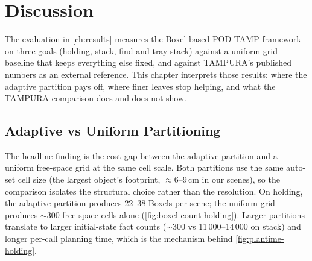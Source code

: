 
\chapter{Discussion}
\label{ch:discussion}

The evaluation in \cref{ch:results} measures the Boxel-based POD-TAMP
framework on three goals (holding, stack, find-and-tray-stack) against a
uniform-grid baseline that keeps everything else fixed, and against
TAMPURA's published numbers as an external reference. This chapter
interprets those results: where the adaptive partition pays off, where
finer leaves stop helping, and what the TAMPURA comparison does and does
not show.

\section{Adaptive vs Uniform Partitioning}
\label{sec:disc-semantic-vs-uniform}

The headline finding is the cost gap between the adaptive partition and a
uniform free-space grid at the same cell scale. Both partitions use the
same auto-set cell size (the largest object's footprint, $\approx$6--9\,cm
in our scenes), so the comparison isolates the structural choice rather
than the resolution. On holding, the adaptive partition produces 22--38
Boxels per scene; the uniform grid produces $\sim$300 free-space cells
alone (\cref{fig:boxel-count-holding}). Larger partitions translate to larger initial-state
fact counts ($\sim$300 vs 11\,000--14\,000 on stack) and longer per-call
planning time, which is the mechanism behind \cref{fig:plantime-holding}.


